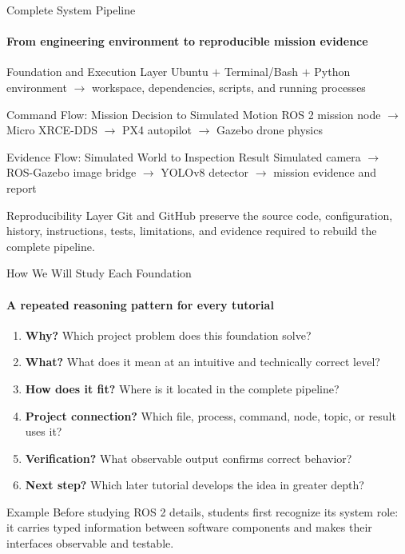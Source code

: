 \begin{frame}{Complete System Pipeline}
\framesubtitle{From engineering environment to reproducible mission evidence}
\footnotesize
\begin{block}{Foundation and Execution Layer}
\centering
Ubuntu $+$ Terminal/Bash $+$ Python environment
$\longrightarrow$
workspace, dependencies, scripts, and running processes
\end{block}
\pause
\begin{block}{Command Flow: Mission Decision to Simulated Motion}
\centering
ROS 2 mission node
$\longrightarrow$
Micro XRCE-DDS
$\longrightarrow$
PX4 autopilot
$\longrightarrow$
Gazebo drone physics
\end{block}
\pause
\begin{exampleblock}{Evidence Flow: Simulated World to Inspection Result}
\centering
Simulated camera
$\longrightarrow$
ROS-Gazebo image bridge
$\longrightarrow$
YOLOv8 detector
$\longrightarrow$
mission evidence and report
\end{exampleblock}
\pause
\begin{alertblock}{Reproducibility Layer}
Git and GitHub preserve the source code, configuration, history, instructions, tests, limitations, and evidence required to rebuild the complete pipeline.
\end{alertblock}
\end{frame}

\begin{frame}{How We Will Study Each Foundation}
\framesubtitle{A repeated reasoning pattern for every tutorial}
\footnotesize
\begin{enumerate}
    \setlength{\itemsep}{0.35em}
    \item \textbf{Why?} Which project problem does this foundation solve?
    \item \textbf{What?} What does it mean at an intuitive and technically correct level?
    \item \textbf{How does it fit?} Where is it located in the complete pipeline?
    \item \textbf{Project connection?} Which file, process, command, node, topic, or result uses it?
    \item \textbf{Verification?} What observable output confirms correct behavior?
    \item \textbf{Next step?} Which later tutorial develops the idea in greater depth?
\end{enumerate}
\begin{exampleblock}{Example}
Before studying ROS 2 details, students first recognize its system role: it carries typed information between software components and makes their interfaces observable and testable.
\end{exampleblock}
\end{frame}


